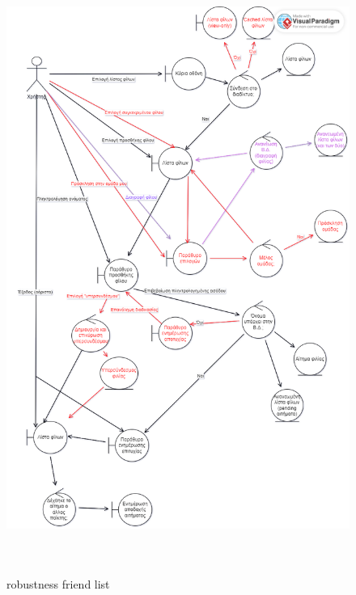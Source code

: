 \begin{figure}[!htb]
  \centering
    \centering
    \includegraphics[width=19cm,height=20cm]{robust_friends.png}
    \caption{robustness friend list}
    \label{}
\end{figure}
